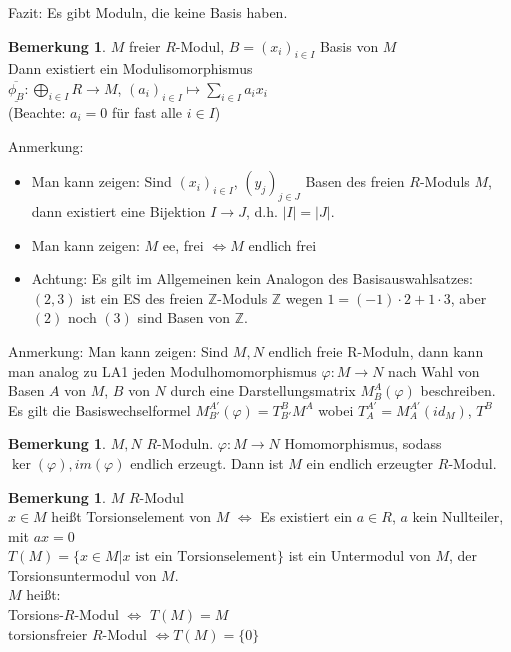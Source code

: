 \documentclass[10pt,a4paper,numbers=endperiod]{scrartcl}
\theoremstyle{definition}
\newtheorem{bem}[satz]{Bemerkung}
\def\ZZ{{\mathbb Z}}
\begin{document}
Fazit: Es gibt Moduln, die keine Basis haben.

\begin{bem}
	$M$ freier $R$-Modul, $B = (x_i)_{i \in I}$ Basis von $M$\\
	Dann existiert ein Modulisomorphismus\\
	$\overline{\underline{\phi_B}}: \bigoplus\limits_{i \in I} R \rightarrow M$, $(a_i)_{i \in I} \mapsto \sum\limits_{i \in I} a_ix_i$\\
	(Beachte: $a_i = 0$ für fast alle $i \in I$)
\end{bem}

Anmerkung: \begin{itemize}
	\item Man kann zeigen: Sind $(x_i)_{i \in I}$, $(y_j)_{j \in J}$ Basen des freien $R$-Moduls $M$, dann existiert eine Bijektion $I \rightarrow J$, d.h. $|I| = |J|$. 
	\item Man kann zeigen: $M$ ee, frei $\Leftrightarrow M$ endlich frei
	\item Achtung: Es gilt im Allgemeinen kein Analogon des Basisauswahlsatzes: $(2,3)$ ist ein ES des freien $\ZZ$-Moduls $\ZZ$ wegen $1 = (-1) \cdot 2 + 1 \cdot 3$, aber $(2)$ noch $(3)$ sind Basen von $\ZZ$.  
\end{itemize}

Anmerkung: Man kann zeigen: Sind $M, N$ endlich freie R-Moduln, dann kann man analog zu LA1 jeden Modulhomomorphismus $\varphi: M \rightarrow N$ nach Wahl von Basen $A$ von $M$, $B$ von $N$ durch eine Darstellungsmatrix $M_B^A(\varphi)$ beschreiben. Es gilt die Basiswechselformel $M_{B'}^{A'}(\varphi) = T_{B'}^B M^A$ wobei $T_A^{A'} = M_A^{A'}(id_M)$, $T^B$

\begin{bem}
	$M, N$ $R$-Moduln. $\varphi: M \rightarrow N$ Homomorphismus, sodass $\ker(\varphi), im(\varphi)$ endlich erzeugt. Dann ist $M$ ein endlich erzeugter $R$-Modul.
\end{bem}

\begin{bem}
	$M$ $R$-Modul\\
	$x \in M$ heißt Torsionselement von $M$ $\Leftrightarrow$ Es existiert ein $a \in R$, $a$ kein Nullteiler, mit $ax = 0$\\
	$T(M) = \{x \in M| x \text{ ist ein Torsionselement}\}$ ist ein Untermodul von $M$, der Torsionsuntermodul von $M$.\\
	$M$ heißt:\\
	Torsions-$R$-Modul $\Leftrightarrow$ $T(M) = M$\\
	torsionsfreier $R$-Modul $\Leftrightarrow T(M) = \{0\}$ 
\end{bem}
\end{document}
